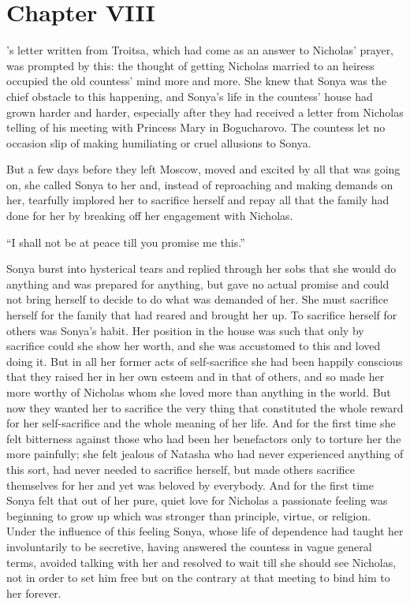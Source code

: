 \chapter*{Chapter VIII} \ifaudio {}
\fi

's letter written from Troitsa, which had come as an answer
to Nicholas' prayer, was prompted by this: the thought of getting
Nicholas married to an heiress occupied the old countess' mind
more and more. She knew that Sonya was the chief obstacle to this
happening, and Sonya's life in the countess' house had grown
harder and harder, especially after they had received a letter
from Nicholas telling of his meeting with Princess Mary in
Bogucharovo. The countess let no occasion slip of making
humiliating or cruel allusions to Sonya.

But a few days before they left Moscow, moved and excited by all
that was going on, she called Sonya to her and, instead of
reproaching and making demands on her, tearfully implored her to
sacrifice herself and repay all that the family had done for her
by breaking off her engagement with Nicholas.

``I shall not be at peace till you promise me this.''

Sonya burst into hysterical tears and replied through her sobs
that she would do anything and was prepared for anything, but
gave no actual promise and could not bring herself to decide to
do what was demanded of her. She must sacrifice herself for the
family that had reared and brought her up. To sacrifice herself
for others was Sonya's habit. Her position in the house was such
that only by sacrifice could she show her worth, and she was
accustomed to this and loved doing it. But in all her former acts
of self-sacrifice she had been happily conscious that they raised
her in her own esteem and in that of others, and so made her more
worthy of Nicholas whom she loved more than anything in the
world. But now they wanted her to sacrifice the very thing that
constituted the whole reward for her self-sacrifice and the whole
meaning of her life.  And for the first time she felt bitterness
against those who had been her benefactors only to torture her
the more painfully; she felt jealous of Natasha who had never
experienced anything of this sort, had never needed to sacrifice
herself, but made others sacrifice themselves for her and yet was
beloved by everybody. And for the first time Sonya felt that out
of her pure, quiet love for Nicholas a passionate feeling was
beginning to grow up which was stronger than principle, virtue,
or religion. Under the influence of this feeling Sonya, whose
life of dependence had taught her involuntarily to be secretive,
having answered the countess in vague general terms, avoided
talking with her and resolved to wait till she should see
Nicholas, not in order to set him free but on the contrary at
that meeting to bind him to her forever.

